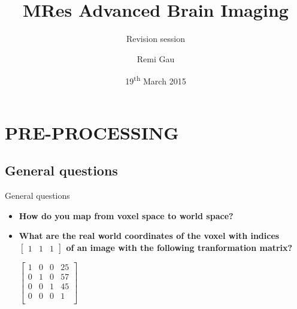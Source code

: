 \documentclass{beamer}
\title[MRes Advanced Brain Imaging]
{MRes Advanced Brain Imaging}
\subtitle[Revision session]
{Revision session}
\author[Remi Gau]
{Remi Gau}
\institute[University of Birmingham]
{
School of psychology\\
University of Birmingham
}
\date[Short Occasion]
{19\textsuperscript{th} March 2015}
\begin{document}
\footnotesize


\begin{frame}
  \titlepage
\end{frame}


\section{PRE-PROCESSING}


\subsection[General questions]{General questions}


\begin{frame}{General questions}
  \begin{itemize}
    \item \textbf{How do you map from voxel space to world space?}

    \smallskip 

    \item \textbf{What are the real world coordinates of the voxel with indices $\left[\begin{array}{ccc} 1&1&1\end{array}\right]$ of an image with the following tranformation matrix?}

    \begin{center}
      $
      \left[
      \begin{array}{cccc}
      1 & 0 & 0 & 25\\
      0 & 1 & 0 & 57\\
      0 & 0 & 1 & 45\\
      0 & 0 & 0 & 1\\
      \end{array}
      \right]
      $
    \end{center}

  \end{itemize}
\end{frame}
\end{document}
